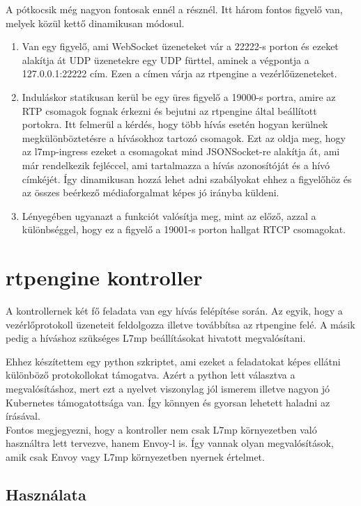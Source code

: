 A pótkocsik még nagyon fontosak ennél a résznél. Itt három fontos figyelő van, melyek közül
kettő dinamikusan módosul.

\begin{enumerate}
	\item Van egy figyelő, ami WebSocket üzeneteket vár a 22222-s porton és ezeket alakítja át
	UDP üzenetekre egy UDP fürttel, aminek a végpontja a 127.0.0.1:22222 cím. Ezen a címen várja
	az rtpengine a vezérlőüzeneteket. 
	\item Induláskor statikusan kerül be egy üres figyelő a 19000-s portra, amire az RTP csomagok
	fognak érkezni és bejutni az rtpengine által beállított portokra. Itt felmerül a kérdés, hogy 
	több hívás esetén hogyan kerülnek megkülönböztetésre a hívásokhoz tartozó csomagok. Ezt az
	oldja meg, hogy az l7mp-ingress ezeket a csomagokat mind JSONSocket-re alakítja át, ami már 
	rendelkezik fejléccel, ami tartalmazza a hívás azonosítóját és a hívó címkéjét. Így dinamikusan
	hozzá lehet adni szabályokat ehhez a figyelőhöz és az összes beérkező médiaforgalmat képes jó
	irányba küldeni. 
	\item Lényegében ugyanazt a funkciót valósítja meg, mint az előző, azzal a különbséggel, hogy
	ez a figyelő a 19001-s porton hallgat RTCP csomagokat. 
\end{enumerate}

\section{rtpengine kontroller}

A kontrollernek két fő feladata van egy hívás felépítése során. Az egyik, hogy
a vezérlőprotokoll üzeneteit feldolgozza illetve továbbítsa az rtpengine
felé. A másik pedig a híváshoz szükséges L7mp beállításokat hivatott 
megvalósítani.

Ehhez készítettem egy python szkriptet, ami ezeket a feladatokat képes ellátni
különböző protokollokat támogatva. Azért a python lett választva a megvalósításhoz,
mert ezt a nyelvet viszonylag jól ismerem illetve nagyon jó Kubernetes 
támogatottsága van. Így könnyen és gyorsan lehetett haladni az írásával. \\

Fontos megjegyezni, hogy a kontroller nem csak L7mp környezetben való használtra lett
tervezve, hanem Envoy-l is. Így vannak olyan megvalósítások, amik csak Envoy
vagy L7mp környezetben nyernek értelmet. 

\subsection{Használata}

